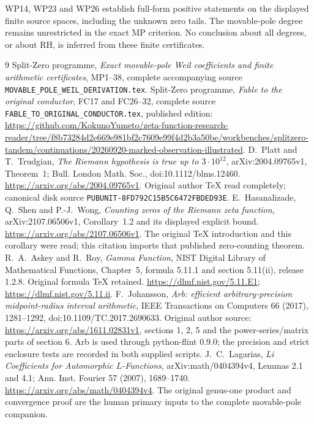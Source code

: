 WP14, WP23 and WP26 establish full-form positive statements on
the displayed finite source spaces, including the unknown
zero tails. The movable-pole degree remains unrestricted in
the exact MP criterion. No conclusion about all degrees, or
about RH, is inferred from these finite certificates.

\begin{thebibliography}{9}
 Split-Zero programme,
\emph{Exact movable-pole Weil coefficients and finite arithmetic
certificates}, MP1--38, complete accompanying source
\texttt{MOVABLE\_POLE\_WEIL\_DERIVATION.tex}.
 Split-Zero programme,
\emph{Fable to the original conductor}, FC17 and FC26--32,
complete source \texttt{FABLE\_TO\_ORIGINAL\_CONDUCTOR.tex},
published edition:
\url{https://github.com/KokunoYumeto/zeta-function-research-reader/tree/f8b73284d2e669e981bf2c7609e99f4d2b3a50be/workbenches/splitzero-tandem/continuations/20260920-marked-observation-illustrated}.
 D.~Platt and T.~Trudgian,
\emph{The Riemann hypothesis is true up to $3\cdot10^{12}$},
arXiv:2004.09765v1, Theorem~1; Bull. London Math. Soc.,
doi:10.1112/blms.12460.
\url{https://arxiv.org/abs/2004.09765v1}.
Original author TeX read completely; canonical disk source
\texttt{PUBUNIT-8FD792C15B5C6472FBDED93E}.
 E.~Hasanalizade, Q.~Shen and P.-J.~Wong,
\emph{Counting zeros of the Riemann zeta function},
arXiv:2107.06506v1, Corollary~1.2 and its displayed explicit
bound. \url{https://arxiv.org/abs/2107.06506v1}.
The original TeX introduction and this corollary were read;
this citation imports that published zero-counting theorem.
 R.~A.~Askey and R.~Roy,
\emph{Gamma Function}, NIST Digital Library of Mathematical
Functions, Chapter~5, formula 5.11.1 and section 5.11(ii),
release 1.2.8. Original formula TeX retained.
\url{https://dlmf.nist.gov/5.11.E1};
\url{https://dlmf.nist.gov/5.11.ii}.
 F.~Johansson,
\emph{Arb: efficient arbitrary-precision midpoint-radius
interval arithmetic}, IEEE Transactions on Computers 66
(2017), 1281--1292, doi:10.1109/TC.2017.2690633.
Original author source: \url{https://arxiv.org/abs/1611.02831v1},
sections 1, 2, 5 and the power-series/matrix parts of section 6.
Arb is used through python-flint 0.9.0; the precision and
strict enclosure tests are recorded in both supplied scripts.
 J.~C.~Lagarias,
\emph{Li Coefficients for Automorphic $L$-Functions},
arXiv:math/0404394v4, Lemmas 2.1 and 4.1; Ann. Inst. Fourier
57 (2007), 1689--1740.
\url{https://arxiv.org/abs/math/0404394v4}.
The original genus-one product and convergence proof are the
human primary inputs to the complete movable-pole companion.
\end{thebibliography}

